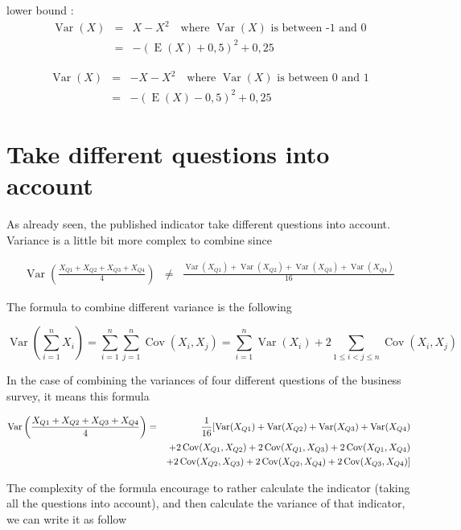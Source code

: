 \documentclass[12pt,a4paper,oneside]{book}
\DeclareMathOperator{\Var}{Var}
\DeclareMathOperator{\Cov}{Cov}
\DeclareMathOperator{\E}{E}
\begin{document}
lower bound : 
\begin{eqnarray}
\Var(X) &=& X - X^2 \quad \text{where } \Var(X) \text{ is between -1 and 0} \\
    &=& - (\E(X) + 0,5)^2 + 0,25 
\end{eqnarray}

\begin{eqnarray}
    \Var(X) &=& - X - X^2 \quad \text{where } \Var(X) \text{ is between 0 and 1} \\
        &=&  - (\E(X) - 0,5)^2 + 0,25
\end{eqnarray}
    

\section{Take different questions into account}

As already seen, the published indicator take different questions into account. 
Variance is a little bit more complex to combine since

\begin{eqnarray}
    \Var \left(\frac{X_{Q1} + X_{Q2} + X_{Q3} + X_{Q4}}{4} \right) &\neq&
    \frac{\Var(X_{Q1}) + \Var(X_{Q2}) + \Var(X_{Q3}) + \Var(X_{Q4})}{16} \nonumber
\end{eqnarray}

The formula to combine different variance is the following

\begin{equation}
\Var \left(\sum_{i=1}^{n} X_{i}\right) = \sum_{i=1}^{n} \sum_{j=1}^{n} \Cov\left(X_{i}, X_{j}\right)
= \sum_{i=1}^{n} \Var\left(X_{i}\right)+2 \sum_{1 \leq i<j \leq n} \Cov\left(X_{i}, X_{j}\right)
\end{equation}

In the case of combining the variances of four different questions of the business survey, it means this formula

\begin{eqnarray}
    \Var \left(\frac{X_{Q1} + X_{Q2} + X_{Q3} + X_{Q4}}{4} \right) &=& \frac{1}{16} \large[ \Var(X_{Q1}) + \Var(X_{Q2}) + \Var(X_{Q3}) + \Var(X_{Q4}) \nonumber \\
    && + 2 \Cov (X_{Q1},X_{Q2}) + 2 \Cov (X_{Q1},X_{Q3}) + 2 \Cov (X_{Q1},X_{Q4}) \nonumber \\
    &&  + 2 \Cov (X_{Q2},X_{Q3}) + 2 \Cov (X_{Q2},X_{Q4}) + 2 \Cov (X_{Q3},X_{Q4}) \large] \nonumber
\end{eqnarray}

The complexity of the formula encourage to rather calculate the indicator (taking all the questions into account), and then calculate the variance of that indicator, we can write it as follow
\end{document}
